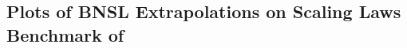 \documentclass{article} %
\begin{document}
\clearpage
\subsection{Plots of BNSL Extrapolations on Scaling Laws Benchmark of \cite{Alabdulmohsi2022revisiting}}
\label{section:Plots_of_BNSL_Extrapolations}
\end{document}
